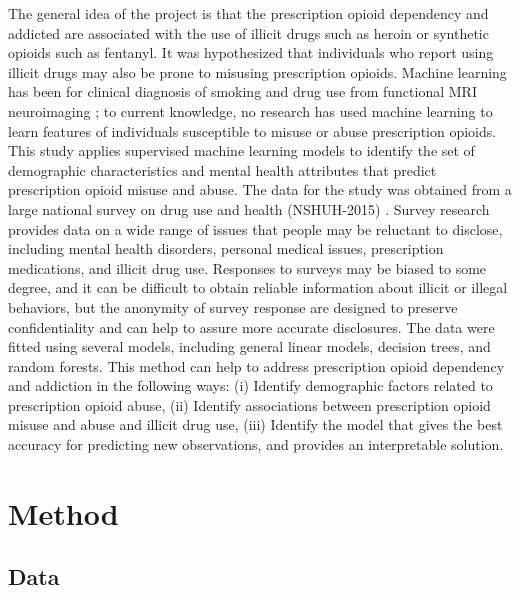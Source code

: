 \documentclass[sigconf]{acmart}
\begin{document}
The general idea of the project is that the prescription opioid dependency 
and addicted are associated with the use of illicit drugs such as heroin or 
synthetic opioids such as fentanyl. It was hypothesized that individuals who 
report using illicit drugs may also be prone to misusing prescription opioids. 
Machine learning has been for clinical diagnosis of smoking and drug use from 
functional MRI neuroimaging \cite{zhang05, pariyadath14}; to current
knowledge, no research has used machine learning to learn features of 
individuals susceptible to misuse or abuse prescription opioids. This study 
applies supervised machine learning models to identify the set of demographic 
characteristics and mental health attributes that predict prescription opioid 
misuse and abuse. The data for the study was obtained from a large national 
survey on drug use and health (NSHUH-2015) \cite{samhsa16}. Survey research 
provides data on a wide range of issues that people may be reluctant to 
disclose, including mental health disorders, personal medical issues, 
prescription medications, and illicit drug use. Responses to surveys may be 
biased to some degree, and it can be difficult to obtain reliable information 
about illicit or illegal behaviors, but the anonymity of survey response are 
designed to preserve confidentiality and can help to assure more accurate 
disclosures. The data were fitted using several models, including general 
linear models, decision trees, and random forests. This method can help to 
address prescription opioid dependency and addiction in the following ways: 
(i) Identify demographic factors related to prescription opioid abuse, (ii) 
Identify associations between prescription opioid misuse and abuse and 
illicit drug use, (iii) Identify the model that gives the best accuracy
for predicting new observations, and provides an interpretable solution. 






\section{Method}

\subsection{Data}
\end{document}
